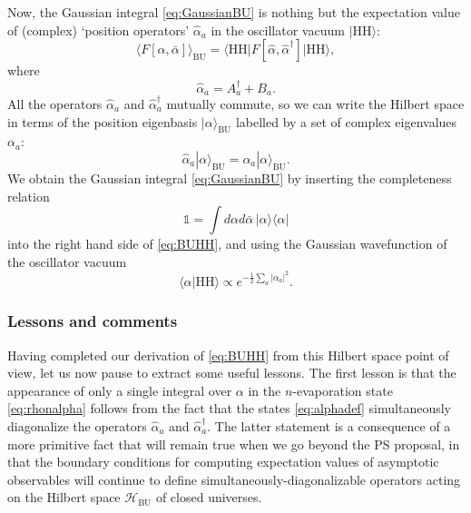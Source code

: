 \documentclass[letterpaper,12pt]{article}
\newcommand*{\hbu}{\mathcal{H}_\text{BU}} %
\newcommand*{\id}{\mathds{1}}
\newcommand{\HH}{\mathrm{HH}} %
\begin{document}
Now, the Gaussian integral \eqref{eq:GaussianBU} is nothing but the expectation value of (complex) `position operators' $\hat{\alpha}_a$ in the oscillator vacuum $|\HH\rangle$:
\begin{equation}\label{eq:BUHH}
	\Big\langle F[\alpha,\bar{\alpha}] \Big\rangle_{\mathrm{BU}} = \big\langle\HH\big|F[\hat{\alpha},\hat{\alpha}^\dag]\big|\HH\big\rangle,
\end{equation}
where
\begin{equation}
	\hat{\alpha}_a = A^\dag_a +B_a.
\end{equation}
All the operators $\hat{\alpha}_a$ and $\hat{\alpha}^\dag_a$ mutually commute, so we can write the Hilbert space in terms of the position eigenbasis $|\alpha\rangle_\mathrm{BU}$ labelled by a set of complex eigenvalues $\alpha_a$:
\begin{equation}
\label{eq:alphadef}
	\hat{\alpha}_a|\alpha\rangle_\mathrm{BU} = \alpha_a|\alpha\rangle_\mathrm{BU}.
\end{equation}
We obtain the Gaussian integral \eqref{eq:GaussianBU} by inserting the completeness relation
\begin{equation}\label{eq:alphacomplete}
	\id  = \int d\alpha d\bar{\alpha}\, |\alpha\rangle\langle\alpha|
\end{equation}
into the right hand side of \eqref{eq:BUHH}, and using the Gaussian wavefunction of the oscillator vacuum
\begin{equation}
\label{eq:HHwavefunction}
	\langle \alpha|\HH\rangle \propto e^{-\tfrac{1}{2} \sum_a |\alpha_a|^2}.
\end{equation}

\subsubsection{Lessons and comments}
\label{sec:lessons}

Having completed our derivation of \eqref{eq:BUHH} from this Hilbert space point of view, let us now pause to extract some useful lessons.  The first lesson is that the appearance of only a single integral over $\alpha$ in the $n$-evaporation state \eqref{eq:rhonalpha} follows from the fact that the states \eqref{eq:alphadef} simultaneously diagonalize the operators $\hat{\alpha}_a$ and $\hat{\alpha}^\dag_a$. The latter statement is a consequence of a more primitive fact that will remain true when we go beyond the PS proposal, in that the boundary conditions for computing expectation values of asymptotic observables will continue to define simultaneously-diagonalizable operators acting on the Hilbert space $\hbu$ of closed universes.
\end{document}
